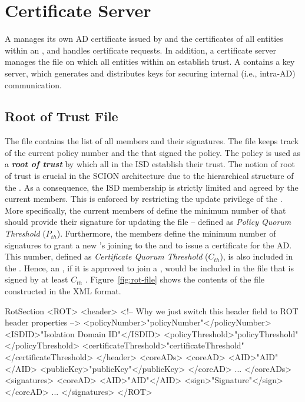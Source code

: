 \chapter{Certificate Server}
A \CS manages its own AD certificate issued by \ISDC and the
certificates of all entities within an \AD, and handles certificate
requests. In addition, a \ISDC certificate server manages the \RT file
on which all entities within an \ISD establish {trust}. A \CS contains
a key server, which generates and distributes keys for securing
internal (i.e., intra-AD) communication.

\section{Root of Trust File} \label{subsec:root-of-trust}
The \RT file contains the list of all \ISDC members and their
signatures. The file keeps track of the current policy number and the
\ADs that signed the policy. The policy is used as a {\bf \em root of
trust} by which all \ADs in the ISD establish their trust. The notion
of root of trust is crucial in the SCION architecture due to the
hierarchical structure of the \ISD. As a consequence, the ISD
membership is strictly limited and agreed by the current members.
This is enforced by restricting the update privilege of the \PF. More
specifically, the current members of \ISDC define the minimum number
of \ADs that should provide their signature for updating the \RT file
-- defined as {\em Policy Quorum Threshold} ($P_{th}$). Furthermore,
the \ISDC members define the minimum number of \AD signatures to grant
a new \AD's joining to the \ISDC and to issue a certificate for the
AD. This number, defined as {\em Certificate Quorum Threshold}
($C_{th}$), is also included in the \PF. Hence, an \AD, if it is
approved to join a \ISDC, would be included in the \RT file that is
signed by at least $C_{th}$ \ISDC \ADs. Figure~\ref{fig:rot-file}
shows the contents of the \RT file constructed in the XML format.

\begin{SaveVerbatim}{RotSection}
<ROT>
	<header> 
	<!-- Why we just switch this header field to ROT header properties -->
		<policyNumber>"policyNumber"</policyNumber>
		<ISDID>"Isolation Domain ID"</ISDID>
		<policyThreshold>"policyThreshold"</policyThreshold>
		<certificateThreshold>"certificateThreshold"</certificateThreshold>
	</header>
	<coreADs>
		<coreAD>
			<AID>"AID"</AID>
			<publicKey>"publicKey"</publicKey>
		</coreAD>
		...
	</coreADs>
	<signatures>
		<coreAD>
			<AID>"AID"</AID>
			<sign>"Signature"</sign>
		</coreAD>
		...
	</signatures>
</ROT>
\end{SaveVerbatim}

